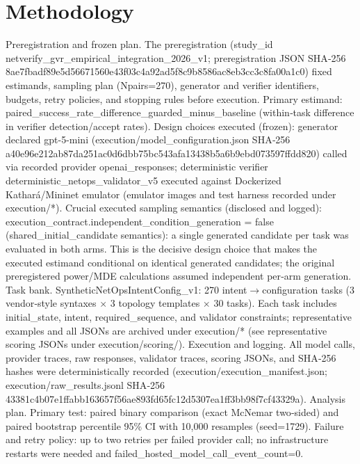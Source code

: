 \documentclass[conference]{IEEEtran}
\begin{document}
\section{Methodology}
Preregistration and frozen plan. The preregistration (study\_id netverify\_gvr\_empirical\_integration\_2026\_v1; preregistration JSON SHA‑256 8ae7fbadf89e5d56671560e43f03c4a92ad5f8c9b8586ac8eb3cc3c8fa00a1c0) fixed estimands, sampling plan (Npairs=270), generator and verifier identifiers, budgets, retry policies, and stopping rules before execution. Primary estimand: paired\_success\_rate\_difference\_guarded\_minus\_baseline (within‑task difference in verifier detection/accept rates). Design choices executed (frozen): generator declared gpt-5-mini (execution/model\_configuration.json SHA‑256 a40e96e212ab87da251ac0d6dbb75bc543afa13438b5a6b9ebd073597ffdd820) called via recorded provider openai\_responses; deterministic verifier deterministic\_netops\_validator\_v5 executed against Dockerized Kathará/Mininet emulator (emulator images and test harness recorded under execution/*). Crucial executed sampling semantics (disclosed and logged): execution\_contract.independent\_condition\_generation = false (shared\_initial\_candidate semantics): a single generated candidate per task was evaluated in both arms. This is the decisive design choice that makes the executed estimand conditional on identical generated candidates; the original preregistered power/MDE calculations assumed independent per‑arm generation. Task bank. SyntheticNetOpsIntentConfig\_v1: 270 intent\ensuremath{\rightarrow}configuration tasks (3 vendor‑style syntaxes \ensuremath{\times} 3 topology templates \ensuremath{\times} 30 tasks). Each task includes initial\_state, intent, required\_sequence, and validator constraints; representative examples and all JSONs are archived under execution/* (see representative scoring JSONs under execution/scoring/). Execution and logging. All model calls, provider traces, raw responses, validator traces, scoring JSONs, and SHA‑256 hashes were deterministically recorded (execution/execution\_manifest.json; execution/raw\_results.jsonl SHA‑256 43381c4b07e1ffabb163657f56ae893fd65fc12d5307ea1ff3bb98f7cf43329a). Analysis plan. Primary test: paired binary comparison (exact McNemar two‑sided) and paired bootstrap percentile 95\% CI with 10,000 resamples (seed=1729). Failure and retry policy: up to two retries per failed provider call; no infrastructure restarts were needed and failed\_hosted\_model\_call\_event\_count=0.
\end{document}
